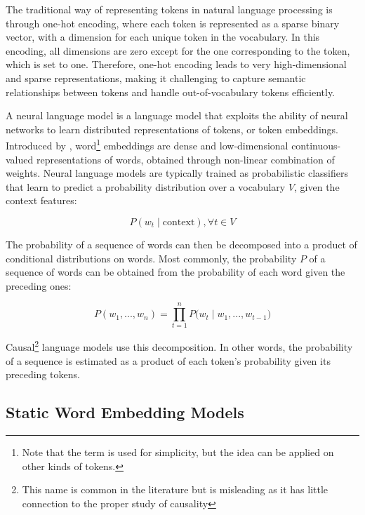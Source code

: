 The traditional way of representing tokens in natural language processing is through one-hot encoding, where each token is represented as a sparse binary vector, with a dimension for each unique token in the vocabulary. In this encoding, all dimensions are zero except for the one corresponding to the token, which is set to one. Therefore, one-hot encoding leads to very high-dimensional and sparse representations, making it challenging to capture semantic relationships between tokens and handle out-of-vocabulary tokens efficiently.

A neural language model is a language model that exploits the ability of neural networks to learn distributed representations of tokens, or token embeddings. Introduced by \citet{bengio2000neural}, word\footnote{Note that the term  is used for simplicity, but the idea can be applied on other kinds of tokens.} embeddings are dense and low-dimensional continuous-valued representations of words, obtained through non-linear combination of weights. Neural language models are typically trained as probabilistic classifiers that learn to predict a probability distribution over a vocabulary $V$, given the context features:

\begin{equation}
    P(w_t \mid \mathrm{context}), \forall t\in V    
\end{equation}

The probability of a sequence of words can then be decomposed into a product of conditional distributions on words. Most commonly, the probability $P$ of a sequence of words can be obtained from the probability of each word given the preceding ones:

\begin{equation}
    P(w_1, ..., w_n) = \prod_{t=1}^{n} P\bigl(w_t \mid w_1, ..., w_{t-1}\bigr)
\label{equation:causal-distribution}
\end{equation}

Causal\footnote{This name is common in the literature but is misleading as it has little connection to the proper study of causality} language models use this decomposition. In other words, the probability of a sequence is estimated as a product of each token's probability given its preceding tokens.

\subsection{Static Word Embedding Models}

